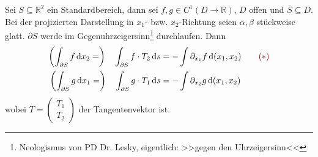 \documentclass[a4paper,10pt]{scrbook}
\begin{document}
\begin{theorem} \label{thm:8.4}
  Sei $S \subseteq \mathbb{R}^2$ ein Standardbereich, dann sei $f,g \in C^1(D \to \mathbb{R})$, $D$ offen und $\overline{S} \subseteq D$. Bei der projizierten Darstellung in $x_1$- bzw. $x_2$-Richtung seien $\alpha,\beta$ stückweise glatt. $\partial S$ werde im Gegenuhrzeigersinn\footnote{Neologismus von PD Dr. Lesky, eigentlich: >>gegen den Uhrzeigersinn<<} durchlaufen. Dann
  \begin{align*}
    \left( \int_{\partial S} f \, \mathrm{d}x_2 = \right) \quad \int_{\partial S} f \cdot T_2 \, \mathrm{d}s &= - \int \partial_{x_1} f \, \mathrm{d}(x_1,x_2) \tag*{{\color{DarkRed} $(*)$}} \\
    \left( \int_{\partial S} g \, \mathrm{d}x_1 = \right) \quad \int_{\partial S} g \cdot T_1 \, \mathrm{d}s &= - \int \partial_{x_2} g \, \mathrm{d}(x_1,x_2) \\
  \end{align*}
  wobei $T = \left( \begin{smallmatrix} T_1 \\ T_2 \end{smallmatrix} \right)$ der Tangentenvektor ist.


\end{theorem}
\end{document}

